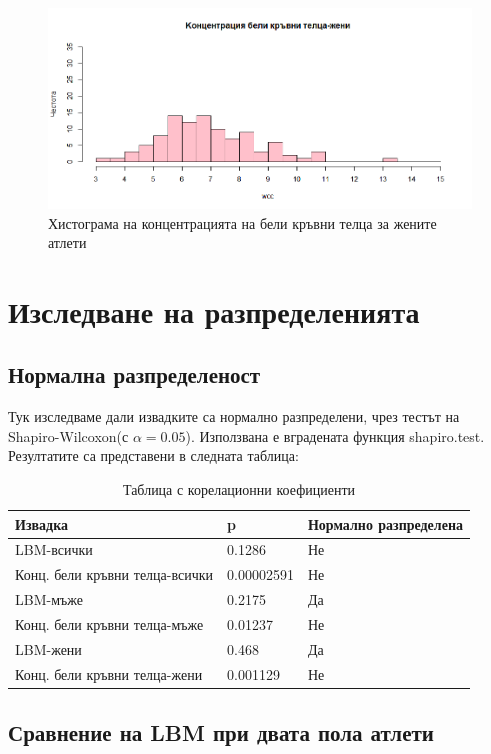 \documentclass[12pt]{article}
\begin{document}
\begin{large}
\begin{figure}[h!]
\includegraphics[width=\textwidth,height=\textheight,keepaspectratio]{pics/wccwomen}
\caption{Хистограма на концентрацията на бели кръвни телца за жените атлети}
\end{figure}

\section{Изследване на разпределенията}

\subsection{Нормална разпределеност}
Тук изследваме дали извадките са нормално разпределени, чрез тестът на Shapiro-Wilcoxon(с $\alpha=0.05$). Използвана е вградената функция shapiro.test. Резултатите са представени в следната таблица:

\begin{table}[h!]
\centering
\begin{tabular}{|l|l|l|}
 \hline 
 Извадка & p & Нормално разпределена\\
 \hline \hline
 LBM-всички & 0.1286 & Не \\
 \hline
 Конц. бели кръвни телца-всички & 0.00002591 & Не \\
 \hline
 LBM-мъже & 0.2175 & Да \\
 \hline
 Конц. бели кръвни телца-мъже & 0.01237 & Не \\
 \hline
 LBM-жени & 0.468 & Да \\
 \hline
 Конц. бели кръвни телца-жени & 0.001129 & Не \\
 \hline
\end{tabular}
\caption{Таблица с корелационни коефициенти}
\end{table}

\subsection{Сравнение на LBM при двата пола атлети}


\end{large}
\end{document}
